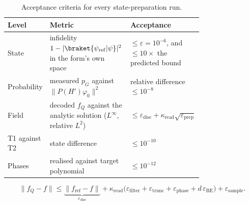 \begin{table}[htbp]
    \centering
    \caption{Acceptance criteria for every state-preparation run.}
    \label{tab:acceptance}
    \small
    \begin{tabular}{@{}l p{0.42\linewidth} p{0.34\linewidth}@{}}
        \toprule
        Level & Metric & Acceptance \\
        \midrule
        State & infidelity $1 - |\braket{\psi_{\mathrm{ref}}|\psi}|^2$ in the form's own space & $\le \varepsilon = 10^{-6}$, and $\le 10\times$ the predicted bound \\
        Probability & measured $p_G$ against $\|P(H')\varphi_0\|^2$ & relative difference $\le 10^{-8}$ \\
        Field & decoded $f_Q$ against the analytic solution ($L^\infty$, relative $L^2$) & $\le \varepsilon_{\mathrm{disc}} + \kappa_{\mathrm{read}}\sqrt{\varepsilon_{\mathrm{prep}}}$ \\
        T1 against T2 & state difference & $\le 10^{-10}$ \\
        Phases & realised against target polynomial & $\le 10^{-12}$ \\
        \bottomrule
    \end{tabular}
\end{table}

\begin{equation}
    \|f_Q - f\| \le
    \underbrace{\|f_{\mathrm{ref}} - f\|}_{\varepsilon_{\mathrm{disc}}}
    + \kappa_{\mathrm{read}}\bigl(\varepsilon_{\mathrm{filter}} + \varepsilon_{\mathrm{trunc}} + \varepsilon_{\mathrm{phase}} + d\,\varepsilon_{\mathrm{BE}}\bigr)
    + \varepsilon_{\mathrm{sample}} .
    \label{eq:error-budget}
\end{equation}

